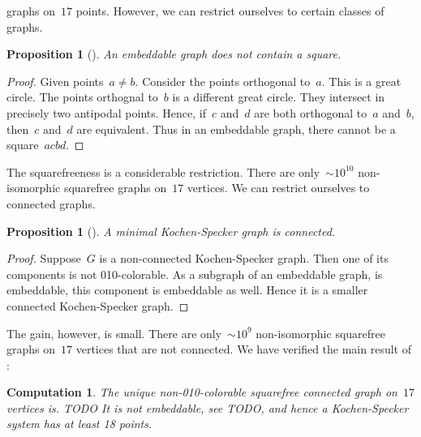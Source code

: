 \documentclass[a4paper]{article}
\newcounter{main}
\newtheorem{prop}[main]{Proposition}
\newtheorem{comp}[main]{Computation}
\theoremstyle{definition}
\theoremstyle{remark}
\begin{document}
graphs on~$17$ points.
However, we can restrict ourselves to certain classes of graphs.
\begin{prop}[\cite{aow11}]
    An embeddable graph does not contain a square.
\end{prop}
\begin{proof}
    Given points~$a\neq b$.
    Consider the points orthogonal to~$a$.
    This is a great circle.
    The points orthognal to~$b$ is a different great circle.
    They intersect in precisely two antipodal points.
    Hence, if~$c$ and~$d$ are both orthogonal to~$a$ and~$b$,
    then~$c$ and~$d$ are equivalent.
    Thus in an embeddable graph, there cannot be a square~$acbd$.
\end{proof}
The squarefreeness is a considerable restriction.  There are
only~${\sim}10^{10}$ non-isomorphic squarefree graphs on~$17$ vertices.
We can restrict ourselves to connected graphs.
\begin{prop}[\cite{aow11}]\label{prop:ks-conn}
    A minimal Kochen-Specker graph is connected.
\end{prop}
\begin{proof}
    Suppose~$G$ is a non-connected Kochen-Specker graph.
    Then one of its components is not 010-colorable.
    As a subgraph of an embeddable graph, is embeddable,
    this component is embeddable as well.
    Hence it is a smaller connected Kochen-Specker graph.
\end{proof}
The gain, however, is small.
There are only~${\sim}10^9$ non-isomorphic squarefree graphs on~$17$
vertices that are not connected.
We have verified the main result of \cite{aow11}:
\begin{comp}
The unique non-010-colorable squarefree connected graph on~$17$
vertices is. TODO
It is not embeddable, see TODO, and hence a Kochen-Specker
system has at least 18 points.
\end{comp}
\end{document}

